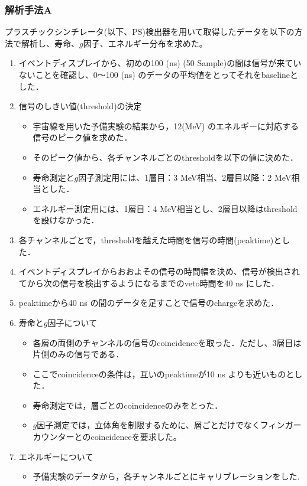\subsubsection{解析手法A}
プラスチックシンチレータ(以下、PS)検出器を用いて取得したデータを以下の方法で解析し、寿命、$g$因子、エネルギー分布を求めた。
\begin{enumerate}
\item イベントディスプレイから、初めの100 (ns) (50 Sample)の間は信号が来ていないことを確認し、0〜100 (ns) のデータの平均値をとってそれをbaselineとした．
\item 信号のしきい値(threshold)の決定
\begin{itemize}
\item 宇宙線を用いた予備実験の結果から，12(MeV) のエネルギーに対応する信号のピーク値を求めた．%
\item そのピーク値から、各チャンネルごとのthresholdを以下の値に決めた．
\item 寿命測定と$g$因子測定用には、1層目：3 MeV相当、2層目以降：2 MeV相当とした．
\item エネルギー測定用には、1層目：4 MeV相当とし、2層目以降はthresholdを設けなかった．%
\end{itemize}
\item 各チャンネルごとで，thresholdを越えた時間を信号の時間(peaktime)とした．
\item イベントディスプレイからおおよその信号の時間幅を決め、信号が検出されてから次の信号を検出するようになるまでのveto時間を40 ns にした．
\item peaktimeから40 ns の間のデータを足すことで信号のchargeを求めた．
\item 寿命と$g$因子について
\begin{itemize}
\item 各層の両側のチャンネルの信号のcoincidenceを取った．ただし、3層目は片側のみの信号である．
\item ここでcoincidenceの条件は，互いのpeaktimeが10 ns よりも近いものとした．
\item 寿命測定では，層ごとのcoincidenceのみをとった．
\item $g$因子測定では，立体角を制限するために、層ごとだけでなくフィンガーカウンターとのcoincidenceを要求した。
\end{itemize}
\item エネルギーについて
\begin{itemize}
\item 予備実験のデータから，各チャンネルごとにキャリブレーションをした.%

\end{itemize}
\end{enumerate}
